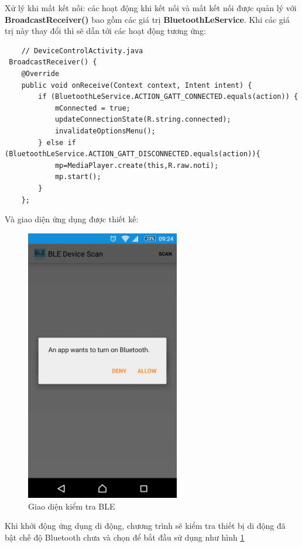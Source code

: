 Xử lý khi mất kết nối: các hoạt động khi kết nối và mất kết nối được quản lý với \textbf{BroadcastReceiver()} bao gồm các giá trị \textbf{BluetoothLeService}. Khi các giá trị này thay đổi thì sẽ dẫn tới các hoạt động tương ứng:

\begin{lstlisting}
	// DeviceControlActivity.java
 BroadcastReceiver() {
  	@Override
  	public void onReceive(Context context, Intent intent) {
  		if (BluetoothLeService.ACTION_GATT_CONNECTED.equals(action)) {
  			mConnected = true;
  			updateConnectionState(R.string.connected);
  			invalidateOptionsMenu();
  		} else if (BluetoothLeService.ACTION_GATT_DISCONNECTED.equals(action)){
	  		mp=MediaPlayer.create(this,R.raw.noti);
	  		mp.start();
  		}
	};
\end{lstlisting}
Và giao diện ứng dụng được thiết kế:

	\begin{figure}[H]
		\centering    
		\includegraphics[width=0.6\textwidth]{androidoff}
		\caption[Giao diện kiểm tra BLE]{Giao diện kiểm tra BLE}
		\label{fig: androidoff}
	\end{figure}
Khi khởi động ứng dụng di động, chương trình sẽ kiểm tra thiết bị di động đã bật chế độ Bluetooth chưa và chọn để bắt đầu sử dụng như hình \ref{fig: androidoff}

